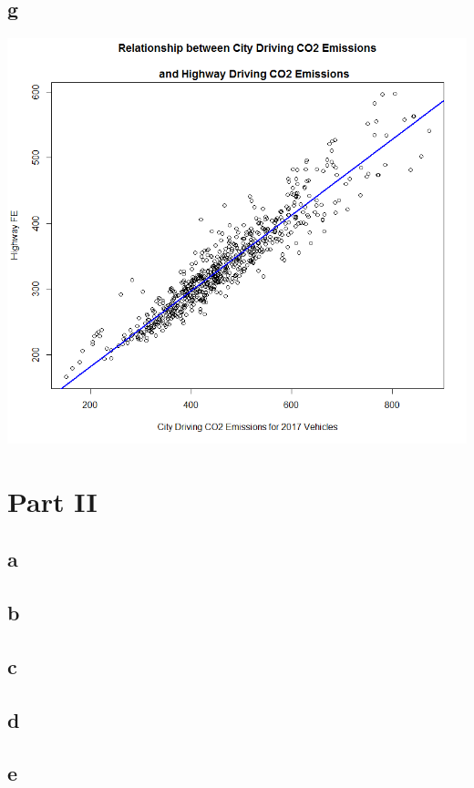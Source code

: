 \documentclass[10pt,letterpaper]{article}
\begin{document}
\subsection*{g}
\includegraphics[scale=.6]{relationship}

\section*{Part II}
\subsection*{a}

\subsection*{b}

\subsection*{c}

\subsection*{d}

\subsection*{e}
\end{document}
